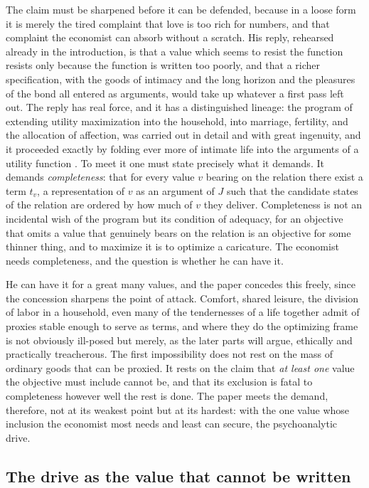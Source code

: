 The claim must be sharpened before it can be defended, because in a loose form it is merely the tired complaint that love is too rich for numbers, and that complaint the economist can absorb without a scratch. His reply, rehearsed already in the introduction, is that a value which seems to resist the function resists only because the function is written too poorly, and that a richer specification, with the goods of intimacy and the long horizon and the pleasures of the bond all entered as arguments, would take up whatever a first pass left out. The reply has real force, and it has a distinguished lineage: the program of extending utility maximization into the household, into marriage, fertility, and the allocation of affection, was carried out in detail and with great ingenuity, and it proceeded exactly by folding ever more of intimate life into the arguments of a utility function \parencite{robbins1932nature}. To meet it one must state precisely what it demands. It demands \emph{completeness}: that for every value $v$ bearing on the relation there exist a term $t_v$, a representation of $v$ as an argument of $J$ such that the candidate states of the relation are ordered by how much of $v$ they deliver. Completeness is not an incidental wish of the program but its condition of adequacy, for an objective that omits a value that genuinely bears on the relation is an objective for some thinner thing, and to maximize it is to optimize a caricature. The economist needs completeness, and the question is whether he can have it.

He can have it for a great many values, and the paper concedes this freely, since the concession sharpens the point of attack. Comfort, shared leisure, the division of labor in a household, even many of the tendernesses of a life together admit of proxies stable enough to serve as terms, and where they do the optimizing frame is not obviously ill-posed but merely, as the later parts will argue, ethically and practically treacherous. The first impossibility does not rest on the mass of ordinary goods that can be proxied. It rests on the claim that \emph{at least one} value the objective must include cannot be, and that its exclusion is fatal to completeness however well the rest is done. The paper meets the demand, therefore, not at its weakest point but at its hardest: with the one value whose inclusion the economist most needs and least can secure, the psychoanalytic drive.

\subsection*{The drive as the value that cannot be written}

